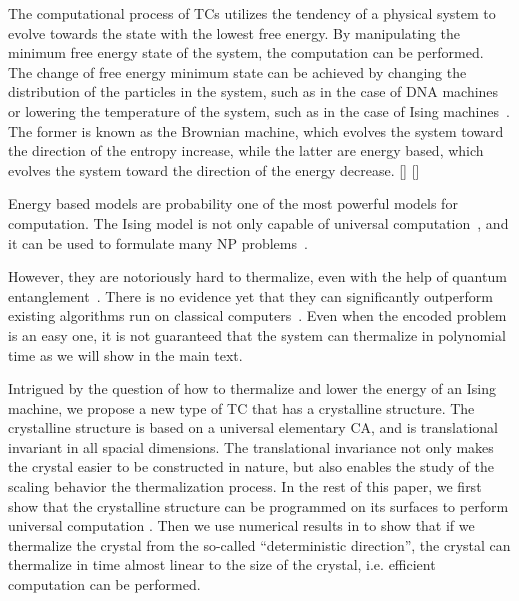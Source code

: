 \documentclass[twocolumn,superscriptaddress,english,showpacs,longbibliography]{revtex4-2}
\newcommand{\jinguo}[1]{[{\color{blue}{JGL: #1}}]}
\newcommand{\ym}[1]{[{\color{red}{YM: #1}}]}
\begin{document}
The computational process of TCs utilizes the tendency of a physical system to evolve towards the state with the lowest free energy.
By manipulating the minimum free energy state of the system, the computation can be performed.
The change of free energy minimum state can be achieved by changing the distribution of the particles in the system, such as in the case of DNA machines~\cite{Feynman2018} or lowering the temperature of the system, such as in the case of Ising machines~\cite{boixo2013experimental}.
The former is known as the Brownian machine, which evolves the system toward the direction of the entropy increase, while the latter are energy based, which evolves the system toward the direction of the energy decrease.
\jinguo{What category are the memristors?} \ym{Memristors are energy based, which evolves the system toward the direction of the energy decrease.}

Energy based models are probability one of the most powerful models for computation.
The Ising model is not only capable of universal computation~\cite{gu2012encoding}, and it can be used to formulate many NP problems~\cite{lucas2014ising,mohseni2022ising}.

However, they are notoriously hard to thermalize, even with the help of quantum entanglement~\cite{boixo2013experimental, boixo2014evidence, Pichler2018, Ebadi2022, Nguyen2023}.
There is no evidence yet that they can significantly outperform existing algorithms run on classical computers~\cite{}.
Even when the encoded problem is an easy one, it is not guaranteed that the system can thermalize in polynomial time as we will show in the main text.

Intrigued by the question of how to thermalize and lower the energy of an Ising machine, we propose a new type of TC that has a crystalline structure.
The crystalline structure is based on a universal elementary CA, and is translational invariant in all spacial dimensions.
The translational invariance not only makes the crystal easier to be constructed in nature, but also enables the study of the scaling behavior the thermalization process.
In the rest of this paper, we first show that the crystalline structure can be programmed on its surfaces to perform universal computation .
Then we use numerical results in  to show that if we thermalize the crystal from the so-called ``deterministic direction'', the crystal can thermalize in time almost linear to the size of the crystal, i.e. efficient computation can be performed.
\end{document}
